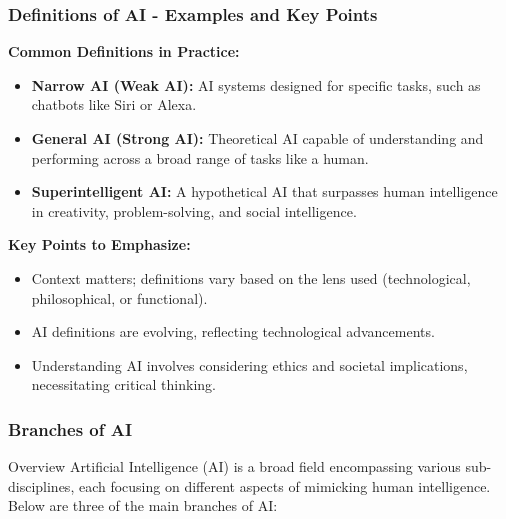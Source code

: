 \documentclass{beamer}
\begin{document}
\begin{frame}[fragile]
    \frametitle{Definitions of AI - Examples and Key Points}
    \textbf{Common Definitions in Practice:}
    \begin{itemize}
        \item \textbf{Narrow AI (Weak AI):} AI systems designed for specific tasks, such as chatbots like Siri or Alexa.
        \item \textbf{General AI (Strong AI):} Theoretical AI capable of understanding and performing across a broad range of tasks like a human.
        \item \textbf{Superintelligent AI:} A hypothetical AI that surpasses human intelligence in creativity, problem-solving, and social intelligence.
    \end{itemize}

    \textbf{Key Points to Emphasize:}
    \begin{itemize}
        \item Context matters; definitions vary based on the lens used (technological, philosophical, or functional).
        \item AI definitions are evolving, reflecting technological advancements.
        \item Understanding AI involves considering ethics and societal implications, necessitating critical thinking.
    \end{itemize}
\end{frame}

\begin{frame}[fragile]
    \frametitle{Branches of AI}
    \begin{block}{Overview}
        Artificial Intelligence (AI) is a broad field encompassing various sub-disciplines, each focusing on different aspects of mimicking human intelligence. Below are three of the main branches of AI:
    \end{block}
\end{frame}
\end{document}
